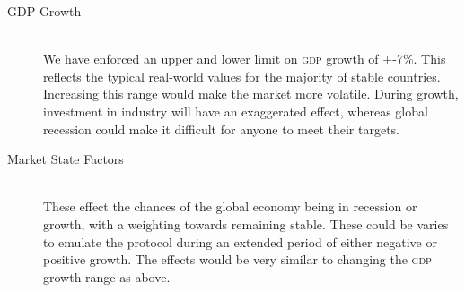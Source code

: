 \begin{description}
\item[GDP Growth] \hfill \\

We have enforced an upper and lower limit on \textsc{gdp} growth of $\pm$-7\%. This reflects the typical real-world values for the majority of stable countries. Increasing this range would make the market more volatile. During growth, investment in industry will have an exaggerated effect, whereas global recession could make it difficult for anyone to meet their targets.

\item[Market State Factors] \hfill \\

These effect the chances of the global economy being in recession or growth, with a weighting towards remaining stable. These could be varies to emulate the protocol during an extended period of either negative or positive growth. The effects would be very similar to changing the \textsc{gdp} growth range as above.
\end{description}
